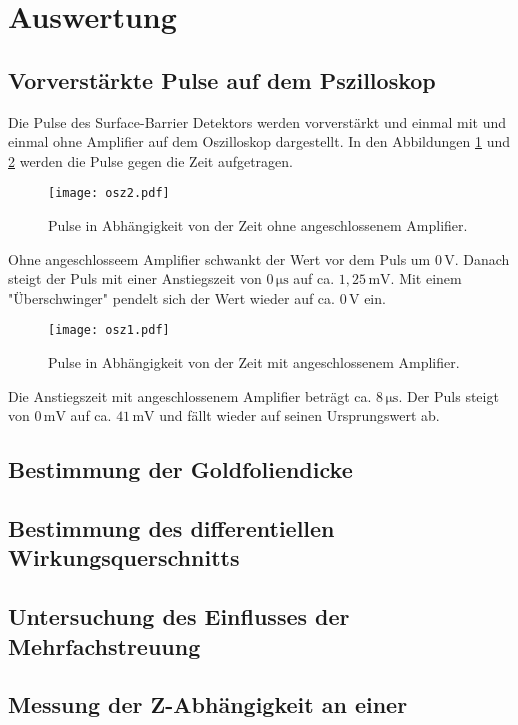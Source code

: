 \section{Auswertung}
\subsection{Vorverstärkte Pulse auf dem Pszilloskop}
Die Pulse des Surface-Barrier Detektors werden vorverstärkt und einmal mit und einmal ohne Amplifier auf dem Oszilloskop dargestellt.
In den Abbildungen \ref{fig:2} und \ref{fig:1} werden die Pulse gegen die Zeit aufgetragen.

\begin{figure}[H]
  \centering
  \texttt{[image: osz2.pdf]}
  \caption{Pulse in Abhängigkeit von der Zeit ohne angeschlossenem Amplifier.}
  \label{fig:2}
\end{figure}

Ohne angeschlosseem Amplifier schwankt der Wert vor dem Puls um $0\,\text{V}$.
Danach steigt der Puls mit einer Anstiegszeit von $0\,\si{\micro\second}$ auf ca. $1,25\,\text{mV}$.
Mit einem "Überschwinger" pendelt sich der Wert wieder auf ca. $0\,\text{V}$ ein.

\begin{figure}[H]
  \centering
  \texttt{[image: osz1.pdf]}
  \caption{Pulse in Abhängigkeit von der Zeit mit angeschlossenem Amplifier.}
  \label{fig:1}
\end{figure}

Die Anstiegszeit mit angeschlossenem Amplifier beträgt ca. $8\,\si{\micro\second}$.
Der Puls steigt von $0\,\text{mV}$ auf ca. $41\,\text{mV}$ und fällt wieder auf seinen Ursprungswert ab.

\subsection{Bestimmung der Goldfoliendicke}


\subsection{Bestimmung des differentiellen Wirkungsquerschnitts}

\subsection{Untersuchung des Einflusses der Mehrfachstreuung}

\subsection{Messung der Z-Abhängigkeit an einer }
